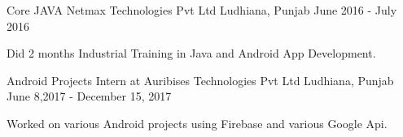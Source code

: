 


\begin{cventries}


\cventry
{Core JAVA} %
{Netmax Technologies Pvt Ltd } %
{Ludhiana, Punjab } %
{June 2016 - July 2016} %
{ %
\begin{cvitems}
\item {Did 2 months Industrial Training in Java and Android App Development.}
\end{cvitems}
}
\cventry
{Android Projects} %
{Intern at Auribises Technologies Pvt Ltd} %
{Ludhiana, Punjab } %
{June 8,2017 - December 15, 2017} %
{ %
\begin{cvitems}
\item {Worked on various Android projects using Firebase and various Google Api.}
\end{cvitems}
}
\end{cventries}






